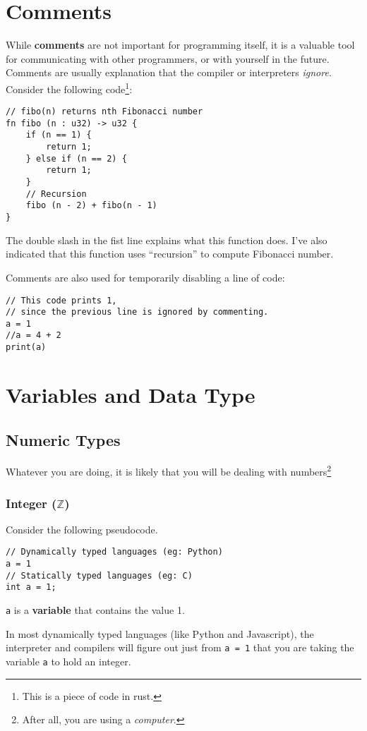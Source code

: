 \documentclass[12pt, a4paper]{article}
\theoremstyle{definition}
\begin{document}
\section{Comments}
While \textbf{comments} are not important for programming itself,
it is a valuable tool for communicating with other programmers,
or with yourself in the future.
Comments are usually explanation that the compiler or interpreters \textit{ignore}.
Consider the following code\footnote{This is a piece of code in rust.}:
\begin{lstlisting}
// fibo(n) returns nth Fibonacci number
fn fibo (n : u32) -> u32 {
    if (n == 1) {
        return 1;
    } else if (n == 2) {
        return 1;
    }
    // Recursion
    fibo (n - 2) + fibo(n - 1)
}
\end{lstlisting}
The double slash in the fist line explains what this function does.
I've also indicated that this function uses ``recursion'' to compute Fibonacci number.

Comments are also used for temporarily disabling a line of code:
\begin{lstlisting}
// This code prints 1,
// since the previous line is ignored by commenting.
a = 1
//a = 4 + 2
print(a)
\end{lstlisting}

\section{Variables and Data Type}
\subsection{Numeric Types}
Whatever you are doing, it is likely that you will be dealing with numbers\footnote{After all, you are using a \textit{computer}.}
\subsubsection{Integer ($\mathbb{Z}$)}
Consider the following pseudocode.
\begin{lstlisting}
// Dynamically typed languages (eg: Python)
a = 1
// Statically typed languages (eg: C)
int a = 1;
\end{lstlisting}
\lstinline{a} is a \textbf{variable} that contains the value 1.

In most dynamically typed languages (like Python and Javascript),
the interpreter and compilers will figure out just from \lstinline{a = 1}
that you are taking the variable \lstinline{a} to hold an integer.
\end{document}
